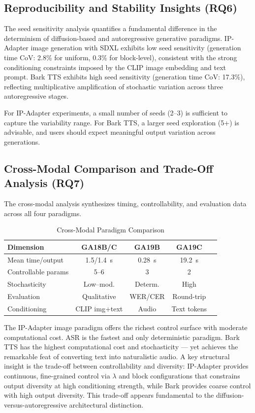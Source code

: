 \documentclass[conference]{IEEEtran}
\newcommand{\ipadapter}{IP-Adapter}
\newcommand{\sdxl}{SDXL}
\begin{document}
\subsection{Reproducibility and Stability Insights (RQ6)}

The seed sensitivity analysis quantifies a fundamental difference in the determinism of diffusion-based and autoregressive generative paradigms. \ipadapter{} image generation with \sdxl{} exhibits low seed sensitivity (generation time CoV: 2.8\% for uniform, 0.3\% for block-level), consistent with the strong conditioning constraints imposed by the CLIP image embedding and text prompt. Bark TTS exhibits high seed sensitivity (generation time CoV: 17.3\%), reflecting multiplicative amplification of stochastic variation across three autoregressive stages.

For \ipadapter{} experiments, a small number of seeds (2--3) is sufficient to capture the variability range. For Bark TTS, a larger seed exploration (5+) is advisable, and users should expect meaningful output variation across generations.

\subsection{Cross-Modal Comparison and Trade-Off Analysis (RQ7)}

The cross-modal analysis synthesizes timing, controllability, and evaluation data across all four paradigms.

\begin{table}[htbp]
\caption{Cross-Modal Paradigm Comparison}
\label{tab:crossmodal}
\centering
\footnotesize
\begin{tabular}{@{}lcccc@{}}
\toprule
\textbf{Dimension} & \textbf{GA18B/C} & \textbf{GA19B} & \textbf{GA19C} \\
\midrule
Mean time/output & 1.5/1.4~s & 0.28~s & 19.2~s \\
Controllable params & 5--6 & 3 & 2 \\
Stochasticity & Low--mod. & Determ. & High \\
Evaluation & Qualitative & WER/CER & Round-trip \\
Conditioning & CLIP img+text & Audio & Text tokens \\
\bottomrule
\end{tabular}
\end{table}

The \ipadapter{} image paradigm offers the richest control surface with moderate computational cost. ASR is the fastest and only deterministic paradigm. Bark TTS has the highest computational cost and stochasticity --- yet achieves the remarkable feat of converting text into naturalistic audio. A key structural insight is the trade-off between controllability and diversity: \ipadapter{} provides continuous, fine-grained control via \(\lambda\) and block configurations that constrains output diversity at high conditioning strength, while Bark provides coarse control with high output diversity. This trade-off appears fundamental to the diffusion-versus-autoregressive architectural distinction.
\end{document}
